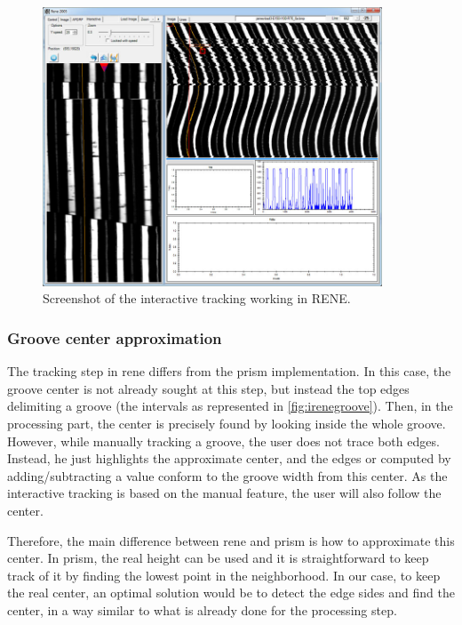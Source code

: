 \begin{figure}[!ht]
\centering
\includegraphics[width=0.9\textwidth]{images/int-tracking-rene}
\caption{Screenshot of the interactive tracking working in RENE.}
\label{fig:ireneintgui}
\end{figure}

\subsubsection{Groove center approximation}

The tracking step in \gls{rene} differs from the \gls{prism} implementation. In this case, the groove center is not already sought at this step, but instead the top edges delimiting a groove (the intervals as represented in \autoref{fig:irenegroove}). Then, in the processing part, the center is precisely found by looking inside the whole groove. However, while manually tracking a groove, the user does not trace both edges. Instead, he just highlights the approximate center, and the edges or computed by adding/subtracting a value conform to the groove width from this center. As the interactive tracking is based on the manual feature, the user will also follow the center.

Therefore, the main difference between \gls{rene} and \gls{prism} is how to approximate this center. In \gls{prism}, the real height can be used and it is straightforward to keep track of it by finding the lowest point in the neighborhood. In our case, to keep the real center, an optimal solution would be to detect the edge sides and find the center, in a way similar to what is already done for the processing step.

